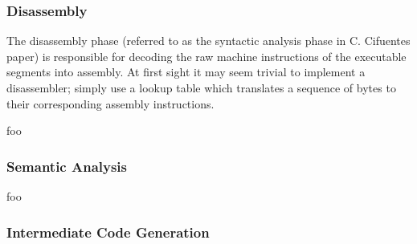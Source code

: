 \subsubsection{Disassembly}

The disassembly phase (referred to as the syntactic analysis phase in C. Cifuentes paper) is responsible for decoding the raw machine instructions of the executable segments into assembly. At first sight it may seem trivial to implement a disassembler; simply use a lookup table which translates a sequence of bytes to their corresponding assembly instructions.

foo

%
%
%


\subsubsection{Semantic Analysis}

foo



\subsubsection{Intermediate Code Generation}


